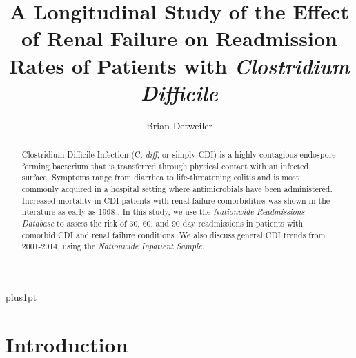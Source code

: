 \documentclass[12pt]{ociamthesis}\usepackage[]{graphicx}\usepackage[]{color}
\title{A Longitudinal Study of the Effect of Renal Failure on Readmission Rates of Patients with \textit{Clostridium Difficile}}
\author{Brian Detweiler}
\begin{document}
\baselineskip=18pt plus1pt

\setcounter{secnumdepth}{3}
\setcounter{tocdepth}{3}


\maketitle                  %

 


\begin{abstract}
Clostridium Difficile Infection (C. \textit{diff}, or simply CDI) 
is a highly contagious endospore forming bacterium that is transferred
through physical contact with an infected surface. Symptoms range from diarrhea to
life-threatening colitis and is most commonly acquired in a hospital setting where
antimicrobials have been administered. Increased mortality in
CDI patients with renal failure comorbidities was shown in the literature as early as 1998 \cite{Cunney1998}.
In this study, we use the \textit{Nationwide Readmissions Database} to assess the risk of 
30, 60, and 90 day readmissions in patients with comorbid 
CDI and renal failure conditions. We also discuss general CDI trends from 2001-2014, using the 
\textit{Nationwide Inpatient Sample}. 
\end{abstract}

\begin{romanpages}          %
\tableofcontents            %
\listoffigures              %
\end{romanpages}            %






\chapter{Introduction}
\end{document}
